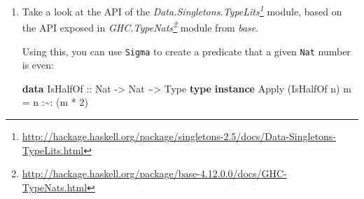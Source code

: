 \documentclass[]{article}
\newenvironment{Shaded}{}{}
\newcommand{\DataTypeTok}[1]{\textcolor[rgb]{0.56,0.13,0.00}{#1}}
\newcommand{\DecValTok}[1]{\textcolor[rgb]{0.25,0.63,0.44}{#1}}
\newcommand{\KeywordTok}[1]{\textcolor[rgb]{0.00,0.44,0.13}{\textbf{#1}}}
\newcommand{\NormalTok}[1]{#1}
\newcommand{\OperatorTok}[1]{\textcolor[rgb]{0.40,0.40,0.40}{#1}}
\newcommand{\OtherTok}[1]{\textcolor[rgb]{0.00,0.44,0.13}{#1}}
\renewcommand{\href}[2]{#2\footnote{\url{#1}}}
\begin{document}
\begin{enumerate}
\begin{Shaded}
\begin{Highlighting}[]
\KeywordTok{type} \DataTypeTok{SomeKnockableDoor} \OtherTok{=} \DataTypeTok{Sigma} \DataTypeTok{DoorState} \DataTypeTok{KnockableDoor}
\end{Highlighting}
\end{Shaded}

  will contain a \texttt{Door} that must be knockable.

  Try doing it for both (a) the ``dependent proof'' version (with the
  \texttt{Knockable} data type) and for (b) the type family version (with the
  \texttt{StatePass} type family).

  \href{https://github.com/mstksg/inCode/tree/master/code-samples/singletons/Door4Final.hs\#L192-L192}{Solutions
  here!} I gave four different ways of doing it, for a full range of manual
  vs.~auto-promoted defunctionalization symbols and \texttt{Knockable}
  vs.~\texttt{Pass}-based methods.

  \emph{Hint:} Look at the definition of \texttt{SomeDoor} in terms of
  \texttt{Sigma}:

\begin{Shaded}
\begin{Highlighting}[]
\KeywordTok{type} \DataTypeTok{SomeDoor} \OtherTok{=} \DataTypeTok{Sigma} \DataTypeTok{DoorState}\NormalTok{ (}\DataTypeTok{TyCon1} \DataTypeTok{Door}\NormalTok{)}
\end{Highlighting}
\end{Shaded}

  \emph{Hint}: Try having \texttt{KnockableDoor} return a tuple.
\item
  Take a look at the API of the
  \emph{\href{http://hackage.haskell.org/package/singletons-2.5/docs/Data-Singletons-TypeLits.html}{Data.Singletons.TypeLits}}
  module, based on the API exposed in
  \emph{\href{http://hackage.haskell.org/package/base-4.12.0.0/docs/GHC-TypeNats.html}{GHC.TypeNats}}
  module from \emph{base}.

  Using this, you can use \texttt{Sigma} to create a predicate that a given
  \texttt{Nat} number is even:

\begin{Shaded}
\begin{Highlighting}[]
\KeywordTok{data} \DataTypeTok{IsHalfOf}\OtherTok{ ::} \DataTypeTok{Nat} \OtherTok{{-}>} \DataTypeTok{Nat} \OperatorTok{\textasciitilde{}>} \DataTypeTok{Type}
\KeywordTok{type} \KeywordTok{instance} \DataTypeTok{Apply}\NormalTok{ (}\DataTypeTok{IsHalfOf}\NormalTok{ n) m }\OtherTok{=}\NormalTok{ n }\OperatorTok{:\textasciitilde{}:}\NormalTok{ (m }\OperatorTok{*} \DecValTok{2}\NormalTok{)}


\end{Highlighting}
\end{Shaded}
\end{enumerate}
\end{document}
